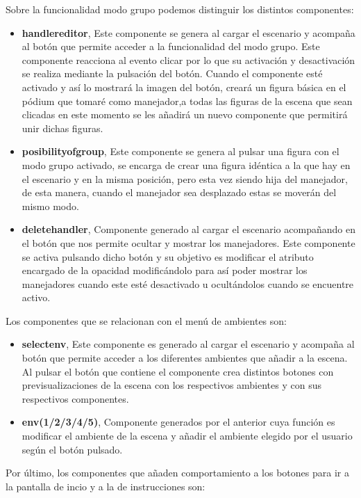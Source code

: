 \documentclass[a4paper, 12pt]{book}
\begin{document}
    
Sobre la funcionalidad modo grupo podemos distinguir los distintos componentes:
\begin{itemize}
    \item \textbf{handlereditor}, Este componente se genera al cargar el escenario y acompaña al botón que permite acceder a la funcionalidad del modo grupo. Este componente reacciona al evento clicar por lo que su activación y desactivación se realiza mediante la pulsación del botón. Cuando el componente esté activado y así lo mostrará la imagen del botón, creará un figura básica en el pódium que tomaré como manejador,a todas las figuras de la escena que sean clicadas en este momento se les añadirá un nuevo componente que permitirá unir dichas figuras.
    
    \item \textbf{posibilityofgroup}, Este componente se genera al pulsar una figura con el modo grupo activado, se encarga de crear una figura idéntica a la que hay en el escenario y en la misma posición, pero esta vez siendo hija del manejador, de esta manera, cuando el manejador sea desplazado estas se moverán del mismo modo.
    
    \item \textbf{deletehandler}, Componente generado al cargar el escenario acompañando en el botón que nos permite ocultar y mostrar los manejadores. Este componente se activa pulsando dicho botón y su objetivo es modificar el atributo encargado de la opacidad modificándolo para así poder mostrar los manejadores cuando este esté desactivado u ocultándolos cuando se encuentre activo.
\end{itemize}

Los componentes que se relacionan con el menú de ambientes son:
\begin{itemize}
    \item \textbf{selectenv}, Este componente es generado al cargar el escenario y acompaña al botón que permite acceder a los diferentes ambientes que añadir a la escena. Al pulsar el botón que contiene el componente crea distintos botones con previsualizaciones de la escena con los respectivos ambientes y con sus respectivos componentes.
    \item \textbf{env(1/2/3/4/5)}, Componente generados por el anterior cuya función es modificar el ambiente de la escena y añadir el ambiente elegido por el usuario según el botón pulsado.
    
\end{itemize}

Por último, los componentes que añaden comportamiento a los botones para ir a la pantalla de incio y a la de instrucciones son:
\end{document}
